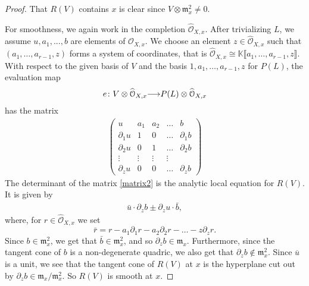 \documentclass[11pt,reqno]{amsart}
\theoremstyle{plain}
\theoremstyle{definition}
\theoremstyle{remark}
\numberwithin{equation}{section}
\renewcommand{\k}{\mathbb{K}}
\renewcommand{\to}{{\longrightarrow}}
\numberwithin{equation}{section}
\renewcommand{\O}{\mathcal O}
\begin{document}
\begin{proof}
  That $R(V)$ contains $x$ is clear since $V \otimes \mathfrak{m}^{2}_{x} \neq 0$.

  For smoothness, we again work in the completion $\widehat{\O}_{X,x}$.
  After trivializing $L$, we assume $u, a_{1}, ..., b$ are elements of $\widehat{\O}_{X,x}$.
  We choose an element $z \in \widehat{\O}_{X,x}$ such that $(a_1, \dots, a_{r-1}, z)$ forms a system of coordinates, that is $\widehat{\O}_{X,x} \cong \k\llbracket a_{1}, \dots , a_{r-1}, z \rrbracket$.
  With respect to the given basis of $V$ and the basis $1, a_1, \dots, a_{r-1}, z$ for $P(L)$, the evaluation map
  \begin{align*}
  e\from V \otimes \widehat{\O}_{X,x} \to P(L) \otimes \widehat{\O}_{X,x}
  \end{align*}
  has the matrix
\begin{align}\label{matrix2}
\begin{pmatrix}
  u & a_{1} & a_{2} & \dots & b \\
  \partial_{1}u & 1 & 0 & \dots & \partial_{1}b \\
  \partial_{2}u & 0 & 1 & \dots & \partial_{2}b \\
  \vdots & \vdots & \vdots & \vdots \\
  \partial_{z}u  & 0 & 0 & \dots & \partial_{z}b
\end{pmatrix}
\end{align}
The determinant of the matrix \eqref{matrix2} is the analytic local equation for $R(V)$.
It is given by
\begin{align*}
   \bar{u} \cdot \partial_{z}b \pm \partial_{z}u \cdot \bar{b},
 \end{align*} 
 where, for $r \in \widehat{\O}_{X,x}$ we set
 \[\bar{r} = r - a_{1}\partial_{1}r - a_{2}\partial_{2}r - \dots - z \partial_{z} r.\]
 Since $b \in {\mathfrak m}^{2}_{x}$, we get that $\bar{b} \in {\mathfrak m}^{2}_{x}$, and so $\partial_{z}b \in {\mathfrak m}_{x}$.
 Furthermore, since the tangent cone of $b$ is a non-degenerate quadric, we also get that $\partial_z b \not \in \mathfrak m_x^2$.
 Since $\overline{u}$ is a unit, we see that the tangent cone of $R(V)$ at $x$ is the hyperplane cut out by $\partial_z b \in \mathfrak m_x/\mathfrak m_x^2$.
 So $R(V)$ is smooth at $x$.
\end{proof}
\end{document}
